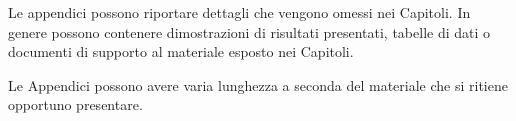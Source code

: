 Le appendici possono riportare dettagli che vengono omessi nei
Capitoli. In genere possono contenere dimostrazioni di risultati
presentati, tabelle di dati o documenti di supporto al materiale
esposto nei Capitoli.

Le Appendici possono avere varia lunghezza a seconda del materiale
che si ritiene opportuno presentare.
